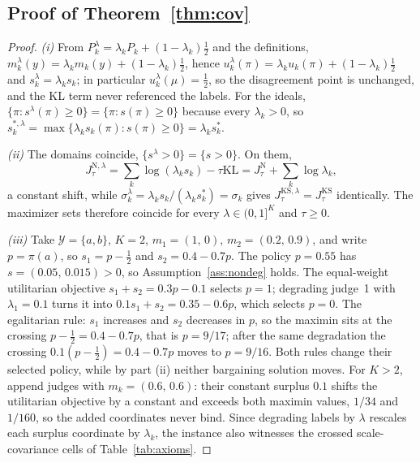 \documentclass[letterpaper]{article} %
\newcommand{\Y}{\mathcal{Y}}
\newcommand{\KL}{\mathrm{KL}}
\begin{document}
\subsection{Proof of Theorem~\ref{thm:cov}}
\begin{proof}
\emph{(i)} From $P^\lambda_k=\lambda_kP_k+(1-\lambda_k)\tfrac12$ and the definitions, $m^\lambda_k(y)=\lambda_km_k(y)+(1-\lambda_k)\tfrac12$, hence $u^\lambda_k(\pi)=\lambda_ku_k(\pi)+(1-\lambda_k)\tfrac12$ and $s^\lambda_k=\lambda_ks_k$; in particular $u^\lambda_k(\mu)=\tfrac12$, so the disagreement point is unchanged, and the KL term never referenced the labels. For the ideals, $\{\pi:s^\lambda(\pi)\ge0\}=\{\pi:s(\pi)\ge0\}$ because every $\lambda_k>0$, so $s^{\ast,\lambda}_k=\max\{\lambda_ks_k(\pi):s(\pi)\ge0\}=\lambda_ks^\ast_k$.

\emph{(ii)} The domains coincide, $\{s^\lambda>0\}=\{s>0\}$. On them,
\[
J^{\mathrm N,\lambda}_\tau=\sum_k\log(\lambda_ks_k)-\tau\KL=J^{\mathrm N}_\tau+\sum_k\log\lambda_k,
\]
a constant shift, while $\sigma^\lambda_k=\lambda_ks_k/(\lambda_ks^\ast_k)=\sigma_k$ gives $J^{\mathrm{KS},\lambda}_\tau=J^{\mathrm{KS}}_\tau$ identically. The maximizer sets therefore coincide for every $\lambda\in(0,1]^K$ and $\tau\ge0$.

\emph{(iii)} Take $\Y=\{a,b\}$, $K=2$, $m_1=(1,\,0)$, $m_2=(0.2,\,0.9)$, and write $p=\pi(a)$, so $s_1=p-\tfrac12$ and $s_2=0.4-0.7p$. The policy $p=0.55$ has $s=(0.05,\,0.015)>0$, so Assumption~\ref{ass:nondeg} holds. The equal-weight utilitarian objective $s_1+s_2=0.3p-0.1$ selects $p=1$; degrading judge~1 with $\lambda_1=0.1$ turns it into $0.1s_1+s_2=0.35-0.6p$, which selects $p=0$. The egalitarian rule: $s_1$ increases and $s_2$ decreases in $p$, so the maximin sits at the crossing $p-\tfrac12=0.4-0.7p$, that is $p=9/17$; after the same degradation the crossing $0.1(p-\tfrac12)=0.4-0.7p$ moves to $p=9/16$. Both rules change their selected policy, while by part (ii) neither bargaining solution moves. For $K>2$, append judges with $m_k=(0.6,\,0.6)$: their constant surplus $0.1$ shifts the utilitarian objective by a constant and exceeds both maximin values, $1/34$ and $1/160$, so the added coordinates never bind. Since degrading labels by $\lambda$ rescales each surplus coordinate by $\lambda_k$, the instance also witnesses the crossed scale-covariance cells of Table~\ref{tab:axioms}.
\end{proof}
\end{document}
